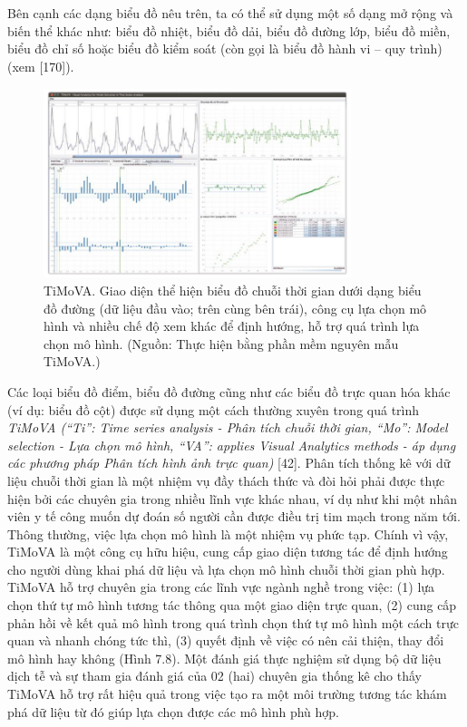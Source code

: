 \\ \\ 
Bên cạnh các dạng biểu đồ nêu trên, ta có thể sử dụng một số dạng mở rộng và biến thể khác như: biểu đồ nhiệt, biểu đồ dải, biểu đồ đường lớp, biểu đồ miền, biểu đồ chỉ số hoặc biểu đồ kiểm soát (còn gọi là biểu đồ hành vi – quy trình) (xem [170]).   
\begin{figure}[H] %
    \centering %
    \includegraphics[width=0.8\textwidth]{assets/fig_7_8.png} 
    \caption{TiMoVA. Giao diện thể hiện biểu đồ chuỗi thời gian dưới dạng biểu đồ đường (dữ liệu đầu vào; trên cùng bên trái), công cụ lựa chọn mô hình và nhiều chế độ xem khác để định hướng, hỗ trợ quá trình lựa chọn mô hình. (Nguồn: Thực hiện bằng phần mềm nguyên mẫu TiMoVA.)} %
    \label{fig:f7.8}
\end{figure}
Các loại biểu đồ điểm, biểu đồ đường cũng như các biểu đồ trực quan hóa khác (ví dụ: biểu đồ cột) được sử dụng một cách thường xuyên trong quá trình \textit{TiMoVA (“Ti”: Time series analysis - Phân tích chuỗi thời gian, “Mo”: Model selection - Lựa chọn mô hình, “VA”: applies Visual Analytics methods - áp dụng các phương pháp Phân tích hình ảnh trực quan)} [42]. Phân tích thống kê với dữ liệu chuỗi thời gian là một nhiệm vụ đầy thách thức và đòi hỏi phải được thực hiện bởi các chuyên gia trong nhiều lĩnh vực khác nhau, ví dụ như khi một nhân viên y tế công muốn dự đoán số người cần được điều trị tim mạch trong năm tới. Thông thường, việc lựa chọn mô hình là một nhiệm vụ phức tạp. Chính vì vậy, TiMoVA là một công cụ hữu hiệu, cung cấp giao diện tương tác để định hướng cho người dùng khai phá dữ liệu và lựa chọn mô hình chuỗi thời gian phù hợp. TiMoVA hỗ trợ chuyên gia trong các lĩnh vực ngành nghề trong việc: (1) lựa chọn thứ tự mô hình tương tác thông qua một giao diện trực quan, (2) cung cấp phản hồi về kết quả mô hình trong quá trình chọn thứ tự mô hình một cách trực quan và nhanh chóng tức thì, (3) quyết định về việc có nên cải thiện, thay đổi mô hình hay không (Hình 7.8). Một đánh giá thực nghiệm sử dụng bộ dữ liệu dịch tễ và sự tham gia đánh giá của 02 (hai) chuyên gia thống kê cho thấy TiMoVA hỗ trợ rất hiệu quả trong việc tạo ra một môi trường tương tác khám phá dữ liệu từ đó giúp lựa chọn được các mô hình phù hợp.